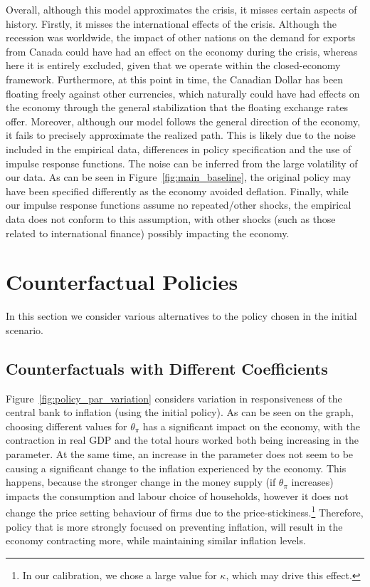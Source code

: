 \documentclass[12pt]{article}
\begin{document}
Overall, although this model approximates the crisis, it misses certain aspects of history. Firstly, it misses the international effects of the crisis. Although the recession was worldwide, the impact of other nations on the demand for exports from Canada could have had an effect on the economy during the crisis, whereas here it is entirely excluded, given that we operate within the closed-economy framework. Furthermore, at this point in time, the Canadian Dollar has been floating freely against other currencies, which naturally could have had effects on the economy through the general stabilization that the floating exchange rates offer. Moreover, although our model follows the general direction of the economy, it fails to precisely approximate the realized path. This is likely due to the noise included in the empirical data, differences in policy specification and the use of impulse response functions. The noise can be inferred from the large volatility of our data. As can be seen in Figure~\ref{fig:main_baseline}, the original policy may have been specified differently as the economy avoided deflation. Finally, while our impulse response functions assume no repeated/other shocks, the empirical data does not conform to this assumption, with other shocks (such as those related to international finance) possibly impacting the economy.

\section{Counterfactual Policies}\label{s:counterfactual_policy}
In this section we consider various alternatives to the policy chosen in the initial scenario.

\subsection*{Counterfactuals with Different Coefficients}

Figure~\ref{fig:policy_par_variation} considers variation in responsiveness of the central bank to inflation (using the initial policy). As can be seen on the graph, choosing different values for $\theta_{\pi}$ has a significant impact on the economy, with the contraction in real GDP and the total hours worked both being increasing in the parameter. At the same time, an increase in the parameter does not seem to be causing a significant change to the inflation experienced by the economy. This happens, because the stronger change in the money supply (if $\theta_\pi$ increases) impacts the consumption and labour choice of households, however it does not change the price setting behaviour of firms due to the price-stickiness.\footnote{In our calibration, we chose a large value for $\kappa$, which may drive this effect.} Therefore, policy that is more strongly focused on preventing inflation, will result in the economy contracting more, while maintaining similar inflation levels.
\end{document}
